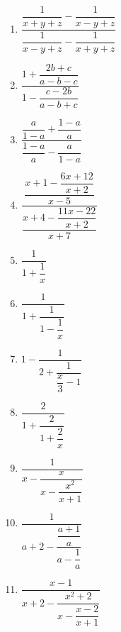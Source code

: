 \documentclass{article}
\begin{document}
\begin{enumerate}[label=\bfseries\small 138.\arabic*, itemsep=2.5cm]
\item $\dfrac{\dfrac{1}{x+y+z} - \dfrac{1}{x-y+z}}{\dfrac{1}{x-y+z} - \dfrac{1}{x+y+z}}$ 

\item $\dfrac{1 + \dfrac{2b + c}{a - b - c}}{1 - \dfrac{c - 2b}{a - b + c}}$ 

\item $\dfrac{\dfrac{a}{1 - a} + \dfrac{1 - a}{a}    }{   \dfrac{1 - a}{a} - \dfrac{a}{1 - a} }$ 

\item $\dfrac{\dfrac{x + 1 - \dfrac{6x + 12}{x + 2}}{x - 5}}{\dfrac{x + 4 - \dfrac{11x - 22}{x + 2}}{x + 7}}$

\item $\dfrac{1}{1 + \dfrac{1}{x}}$

\item $\dfrac{1}{1 + \dfrac{1}{1 - \dfrac{1}{x}}}$

\item $1 - \dfrac{1}{2 + \dfrac{1}{\dfrac{x}{3} - 1}}$

\item $\dfrac{2}{1 + \dfrac{2}{1 + \dfrac{2}{x}}}$

\item $\dfrac{1}{x - \dfrac{x}{x - \dfrac{x^2}{x + 1}}}$

\item $\dfrac{1}{a+2 - \dfrac{\dfrac{a+1}{a}}{a - \dfrac{1}{a}}}$

\item $\dfrac{x-1}{x+2 - \dfrac{x^2 + 2}{x - \dfrac{x-2}{x+1}}}$
\end{enumerate}
\end{document}
